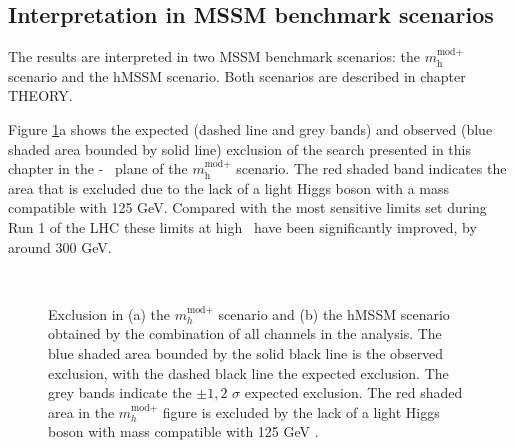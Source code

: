 \subsection{Interpretation in MSSM benchmark scenarios}
\label{sec:mssm_results_modeldep}
The results are interpreted in two MSSM benchmark scenarios: the $m_{\text{h}}^{\text{mod+}}$
scenario and the hMSSM scenario. Both scenarios are described in chapter THEORY.

Figure \ref{fig:mssm_mhmodp_2016}a shows the expected (dashed line and grey bands) and
observed (blue shaded area bounded by solid line) exclusion of the search presented in this chapter
in the \mA-\tanb~ plane of the $m_{\text{h}}^{\text{mod+}}$ scenario. The red shaded band
indicates the area that is excluded due to the lack of a light Higgs boson with a mass compatible
with 125 GeV. Compared with the most sensitive limits set during Run 1 of the \ac{LHC} these
limits at high \tanb~have been significantly improved, by around 300 GeV.

\begin{figure}[h!]
\begin{center}
~\\
\end{center}
\caption{Exclusion in (a) the $m_{h}^{\text{mod}+}$ scenario and (b) the hMSSM scenario 
obtained by the combination
of all channels in the \AHtotautau analysis. The blue shaded area bounded by the 
solid black line is the observed exclusion, with the dashed black line the
expected exclusion. The grey bands indicate the $\pm 1,2$ $\sigma$ 
expected exclusion. The red shaded area in the $m_{h}^{\text{mod}+}$ figure
is excluded by the lack of a light Higgs boson with mass compatible with 125 GeV \cite{CMS-PAS-HIG-16-037}.}
\label{fig:mssm_mhmodp_2016}
\end{figure}

